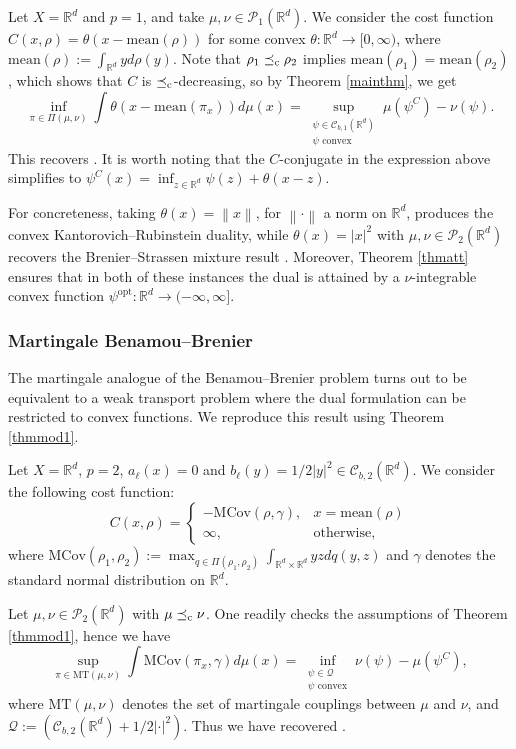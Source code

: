 \documentclass[reqno, a4paper]{amsart}
\newcommand{\lc}{\preceq_{\textnormal{c}}}
\newcommand{\PP}{\mathcal{P}}
\newcommand{\cP}{\mathcal{P}}
\renewcommand{\P}{\cP}
\newcommand{\R}{\mathbb R}
\theoremstyle{definition}
\theoremstyle{definition}
\theoremstyle{definition}
\newcommand{\mean}{\mathrm{mean}}
\begin{document}
Let $X=\R^d$ and $p=1$, and take $\mu,\nu\in\P_1(\R^d).$ We consider the cost function $C(x,\rho)=\theta(x-\mean(\rho))$ for some convex $\theta: \R ^d \to [0,\infty)$, where $\mean(\rho):=\int_{\R^d} y d\rho(y)$. Note that $\rho_1\lc\rho_2$ implies $\mean(\rho_1)=\mean(\rho_2)$, which shows that $C$ is $\lc$-decreasing, so by Theorem \ref{mainthm}, we get
$$\inf_{\pi\in\Pi(\mu,\nu)} \int \theta(x-\mean(\pi_x))d\mu(x)= \sup_{\substack{\psi \in {\mathcal{C}}^{}_{b,1}(\R^d) \\ \psi\text{ convex}}} \mu(\psi^C) - \nu(\psi).$$
This recovers {\cite[Theorem 1.1]{GoJu18}}. It is worth noting that the $C$-conjugate in the expression above simplifies to $\psi^C(x)=
\inf_{z\in\R^d}\psi(z)+\theta(x-z).$

For concreteness, taking $\theta(x)=\left \| x \right \|$, for $\left \| \cdot \right \|$ a norm on $\R^d$, produces the convex Kantorovich--Rubinstein duality, while $\theta(x)=|x|^2$ with $\mu,\nu\in\PP_2(\R^d)$ recovers the Brenier--Strassen mixture result \cite[Theorem 1.2]{GoJu18}. Moreover, Theorem \ref{thmatt} ensures that in both of these instances the dual is attained by a $\nu$-integrable convex function $\psi^{\text{opt}}:\R^d\to(-\infty,\infty]$.

\subsubsection{Martingale Benamou--Brenier} \label{sbm}
The martingale analogue of the Benamou--Brenier problem \cite{backhoffveraguas2025existencebassmartingalesmartingale}  turns out to be equivalent to a weak transport problem where the dual formulation can be restricted to convex functions. We reproduce this result using Theorem \ref{thmmod1}.

Let $X=\R^d$, $p=2$, $a_\ell(x)=0$ and $b_\ell(y)=1/2|y|^2\in{\mathcal{C}}_{b,2}(\R^d)$. We consider the following cost function:
$$C(x,\rho)=  \begin{cases} 
        -\text{MCov}(\rho,\gamma), & x=\mean (\rho) \\
      \infty, & \text{otherwise}, 
   \end{cases}
  $$
where 
$\text{MCov}(\rho_1,\rho_2):=\max_{q \in \Pi(\rho_1,\rho_2) } \int_{\R^d\times \R ^d}yz dq(y,z)$ and $\gamma$ denotes the standard normal distribution on $\R^d$.
 
Let $\mu,\nu\in\PP_2(\R^d)$ with $\mu\lc\nu$. One readily checks the assumptions of Theorem \ref{thmmod1}, hence we have
$$\sup_{\pi\in\text{MT}(\mu,\nu)} \int \text{MCov}(\pi_x,\gamma)d\mu(x)= \inf_{\substack{{\psi \in \mathcal Q} \\\psi \text{ convex} }} \nu(\psi) -\mu(\psi^C),$$
where $\text{MT}(\mu,\nu)$ denotes the set of martingale couplings between $\mu$ and $\nu$, and $\mathcal{Q}:=( {\mathcal{C}}^{}_{b,2}(\R^d)+1/2|\cdot|^2)$. Thus we have recovered \cite[Proposition 3.5]{backhoffveraguas2025existencebassmartingalesmartingale}.
\end{document}
